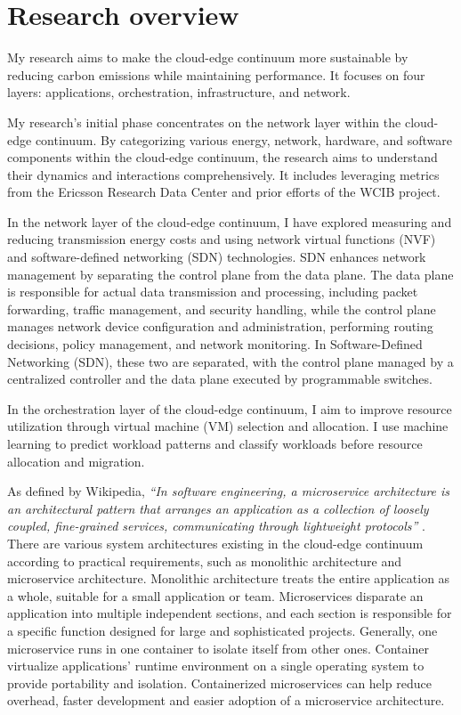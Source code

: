 \documentclass[11pt]{report}
\begin{document}
\section{Research overview}
\label{sec:overview}

My research aims to make the cloud-edge continuum more sustainable by reducing carbon emissions while maintaining performance. It focuses on four layers: applications, orchestration, infrastructure, and network. 

My research's initial phase concentrates on the network layer within the cloud-edge continuum. By categorizing various energy, network, hardware, and software components within the cloud-edge continuum, the research aims to understand their dynamics and interactions comprehensively. It includes leveraging metrics from the Ericsson Research Data Center and prior efforts of the WCIB project.

In the network layer of the cloud-edge continuum, I have explored measuring and reducing transmission energy costs and using network virtual functions (NVF) and software-defined networking (SDN) technologies. SDN enhances network management by separating the control plane from the data plane. The data plane is responsible for actual data transmission and processing, including packet forwarding, traffic management, and security handling, while the control plane manages network device configuration and administration, performing routing decisions, policy management, and network monitoring. In Software-Defined Networking (SDN), these two are separated, with the control plane managed by a centralized controller and the data plane executed by programmable switches.

In the orchestration layer of the cloud-edge continuum, I aim to improve resource utilization through virtual machine (VM) selection and allocation. I use machine learning to predict workload patterns and classify workloads before resource allocation and migration.

As defined by Wikipedia, \textit{``In software engineering, a microservice architecture is an architectural pattern that arranges an application as a collection of loosely coupled, fine-grained services, communicating through lightweight protocols''} \cite{wiki:microservice}. There are various system architectures existing in the cloud-edge continuum according to practical requirements, such as monolithic architecture and microservice architecture. Monolithic architecture treats the entire application as a whole, suitable for a small application or team. Microservices disparate an application into multiple independent sections, and each section is responsible for a specific function designed for large and sophisticated projects. Generally, one microservice runs in one container to isolate itself from other ones. Container virtualize applications' runtime environment on a single operating system to provide portability and isolation. Containerized microservices can help reduce overhead, faster development and easier adoption of a microservice architecture.
\end{document}
